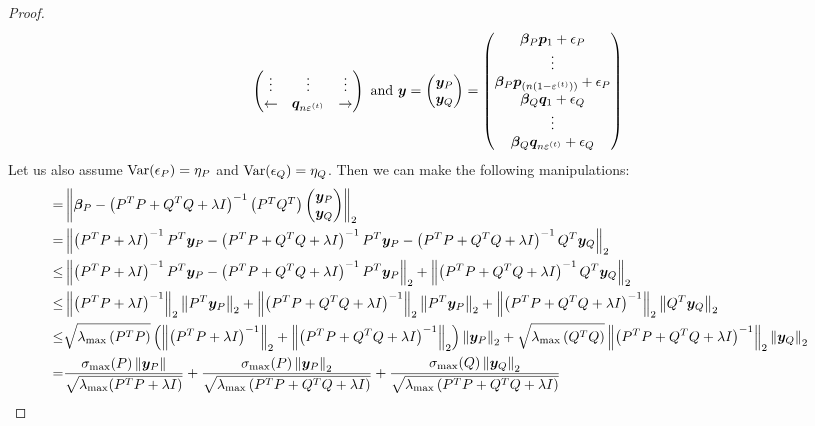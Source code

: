\documentclass{article} %
\newcommand{\norm}[1]{\left\lVert#1\right\rVert}
\begin{document}
\begin{appendices}
\begin{proof}
\begin{equation*}
\begin{pmatrix}
				\vdots & \vdots & \vdots \\
				\leftarrow & {\bm{q}}_{n\varepsilon^{(t)}} & \rightarrow
			\end{pmatrix}\text{ and } {\bm{y}} = \begin{pmatrix}{\bm{y}}_P \\ {\bm{y}}_Q \end{pmatrix} = \begin{pmatrix} {\bm{\beta}}_P{\bm{p}}_1 + {\epsilon}_P \\ \vdots \\ {\bm{\beta}}_P{\bm{p}}_{(n(1-\varepsilon^{(t)}))} + {\epsilon}_P \\ {\bm{\beta}}_Q{\bm{q}}_1 + {\epsilon}_Q\\ \vdots \\ {\bm{\beta}}_Q{\bm{q}}_{n\varepsilon^{(t)}} + {\epsilon}_Q\end{pmatrix}
		\end{equation*}
		Let us also assume $\mathrm{Var}({\epsilon}_P) = \eta_P$ and $\mathrm{Var}({\epsilon}_Q) = \eta_Q$. Then we can make the following manipulations:
		\begin{align*}
			= &\norm{\vbeta_P - \left(P^T P + Q^T Q + \lambda I\right)^{-1}\begin{pmatrix}P^T Q^T\end{pmatrix}\begin{pmatrix}\vy_P \\ \vy_Q \end{pmatrix}}_2 &&\\
			= &\norm{\left(P^T P + \lambda I\right)^{-1} P^T \vy_P - \left(P^T P + Q^T Q + \lambda I\right)^{-1}P^T \vy_P  - \left(P^T P + Q^T Q + \lambda I\right)^{-1}Q^T \vy_Q}_2 &&\\
			\leq &\norm{\left(P^T P + \lambda I\right)^{-1} P^T \vy_P -\left(P^T P + Q^T Q+ \lambda I\right)^{-1}P^T \vy_P}_2 + \norm{\left(P^T P + Q^T Q+ \lambda I\right)^{-1}Q^T \vy_Q}_2 &&\\
			\leq& \norm{\left(P^T P + \lambda I\right)^{-1}}_2 \norm{P^T\vy_P}_2 + \norm{\left(P^T P + Q^T Q + \lambda I\right)^{-1}}_2\norm{P^T \vy_P}_2 + \norm{\left(P^T P + Q^T Q + \lambda I\right)^{-1}}_2\norm{Q^T \vy_Q}_2&&\\
			\leq & \sqrt{\lambda_{\max}\left(P^T P\right)}\left(\norm{\left(P^TP + \lambda I\right)^{-1}}_2+\norm{\left(P^T P + Q^T Q + \lambda I\right)^{-1}}_2\right)\norm{\vy_P}_2 + \sqrt{\lambda_{\max}\left(Q^T Q\right)}\norm{\left(P^T P + Q^T Q + \lambda I\right)^{-1}}_2\norm{\vy_Q}_2 &&\\
			= &\frac{\sigma_{\max}(P)\norm{\vy_P}}{\sqrt{\lambda_{\max}(P^TP + \lambda I)}} + \frac{\sigma_{\max}(P)\norm{\vy_P}_2}{\sqrt{\lambda_{\max}\left(P^T P + Q^T Q + \lambda I\right)}} + \frac{\sigma_{\max}(Q)\norm{\vy_Q}_2}{\sqrt{\lambda_{\max}\left(P^T P + Q^T Q + \lambda I\right)}} &&\\

\end{align*}
\end{proof}
\end{appendices}
\end{document}
